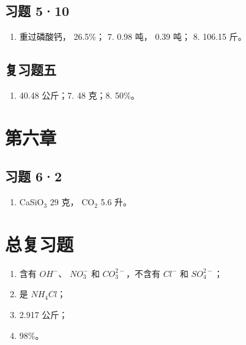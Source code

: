 \subsection{习题 5·10}

\begin{enumerate}[start=5]
\item
  重过磷酸钙， 26.5\%； 7. 0.98 吨， 0.39 吨； 8. 106.15 斤。
\end{enumerate}

\subsection{复习题五}

\begin{enumerate}[start=6]
\item
  40.48 公斤；7. 48 克；8. 50\%。
\end{enumerate}

\section{第六章}

\subsection{习题 6·2}

\begin{enumerate}[start=5]
\item
  CaSiO\(_{3}\) 29 克， CO\(_{2}\) 5.6 升。
\end{enumerate}

\section{总复习题}

\begin{enumerate}[start=22]
\item
  含有 \(OH^{-}\)、 \(NO_{3}^{-}\) 和 \(CO_{3}^{2-}\)，不含有 \(Cl^{-}\)
  和 \(SO_{4}^{2-}\)；
\item
  是 \(NH_{4}Cl\)；
\item
  2.917 公斤；
\item
  98\%。
\end{enumerate}
